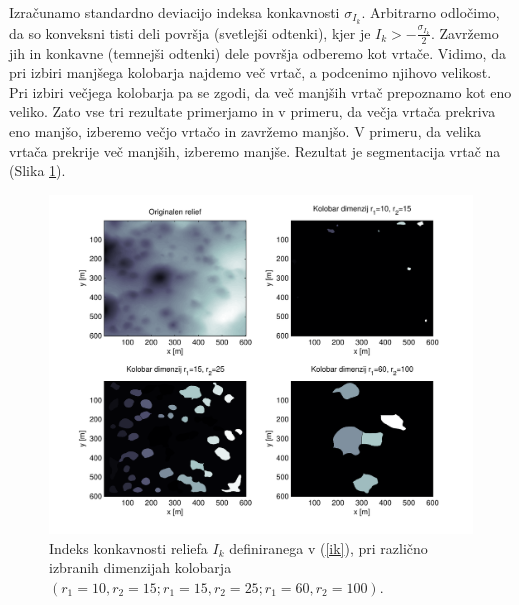 \documentclass[a4paper, twoside, 12pt]{book}
\begin{document}
Izračunamo standardno deviacijo indeksa konkavnosti $\sigma_{I_k}$. Arbitrarno odločimo, da so konveksni tisti deli površja (svetlejši odtenki), kjer je \newline $I_k > -\frac{\sigma_{I_k}}{2}$. Zavržemo jih in konkavne (temnejši odtenki) dele površja odberemo kot vrtače. Vidimo, da pri izbiri manjšega kolobarja najdemo več vrtač, a podcenimo njihovo velikost. Pri izbiri večjega kolobarja pa se zgodi, da več manjših vrtač prepoznamo kot eno veliko. Zato vse tri rezultate primerjamo in v primeru, da večja vrtača prekriva eno manjšo, izberemo večjo vrtačo in zavržemo manjšo. V primeru, da velika vrtača prekrije več manjših, izberemo manjše. Rezultat je segmentacija vrtač na (Slika \ref{fig:concavity-segmentation-samples}).
  \begin{figure}[h!]
    \begin{center}
      \includegraphics[width=12cm]{slike/concavity-segmentation-samples.pdf}
    \end{center}
    \caption{Indeks konkavnosti reliefa $I_k$ definiranega v (\ref{ik}), pri različno izbranih dimenzijah kolobarja $(r_1=10,r_2=15;r_1=15,r_2=25;r_1=60,r_2=100)$.}
    \label{fig:concavity-segmentation-samples}
  \end{figure}
\end{document}

